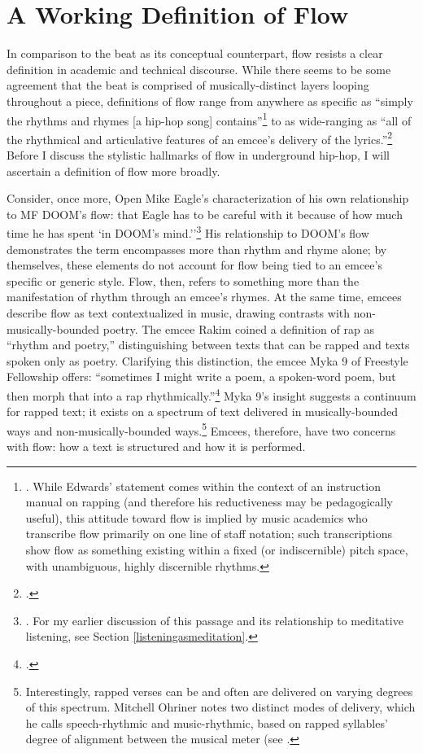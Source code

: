 \onehalfspacing
\label{chapter3}
\section{A Working Definition of Flow}

In comparison to the beat as its conceptual counterpart, flow resists a clear definition in
academic and technical discourse. While there seems to be some agreement that the beat is
comprised of musically-distinct layers looping throughout a piece, definitions of flow 
range from anywhere as specific as ``simply the rhythms and rhymes [a hip-hop song] 
contains''\footnote{
    \autocite[63]{pauledwardsHowRapArt2009}. While Edwards' statement comes within the 
    context of an instruction manual on rapping (and therefore his reductiveness may be 
    pedagogically useful), this attitude toward flow is implied by music academics who 
    transcribe flow primarily on one line of staff notation; such transcriptions show flow
    as something existing within a fixed (or indiscernible) pitch space, with unambiguous,
    highly discernible rhythms.} 
to as wide-ranging as ``all of the rhythmical and articulative features of an emcee's 
delivery of the lyrics.''\footnote{
    \cite{kyleadamsMetricalTechniquesFlow2009}.} 
Before I discuss the stylistic hallmarks of flow in underground hip-hop, I will ascertain
a definition of flow more broadly.

Consider, once more, Open Mike Eagle's characterization of his own relationship to MF 
DOOM's flow: that Eagle has to be careful with it because of how much time he has spent
`in DOOM's mind.''\footnote{
    \cite{estellecaswellRappingDeconstructedBest2016}. For my earlier discussion of this
    passage and its relationship to meditative listening,  see Section 
    \ref{listeningasmeditation}.} 
His relationship to DOOM's flow demonstrates the term encompasses more than rhythm and 
rhyme alone; by themselves, these elements do not account for flow being tied to an emcee's
specific or generic style. Flow, then, refers to something more than the manifestation of 
rhythm through an emcee's rhymes. At the same time, emcees describe flow as text contextualized
in music, drawing contrasts with non-musically-bounded poetry. The emcee Rakim coined a
definition of rap as ``rhythm and poetry,'' distinguishing between texts that can be rapped 
and texts spoken only as poetry. Clarifying this distinction, the emcee Myka 9 of Freestyle 
Fellowship offers: ``sometimes I might write a poem, a spoken-word poem, but then morph that 
into a rap rhythmically.''\footnote{
    \autocite[63]{pauledwardsHowRapArt2009}.}
Myka 9's insight suggests a continuum for rapped text; it exists on a spectrum of text delivered
in musically-bounded ways and non-musically-bounded ways.\footnote{
    Interestingly, rapped verses can be and often are delivered on varying degrees of this
    spectrum. Mitchell Ohriner notes two distinct modes of delivery, which he calls speech-rhythmic
    and music-rhythmic, based on rapped syllables' degree of alignment between the musical meter (see 
    \cite{mitchellohrinerLyricRhythmNonalignment2019}.}
Emcees, therefore, have two concerns with flow: how a text is structured and how it is performed.


